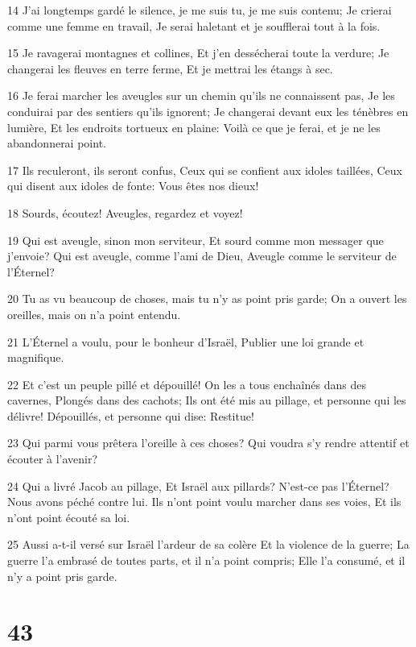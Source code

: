 \par 14 J'ai longtemps gardé le silence, je me suis tu, je me suis contenu; Je crierai comme une femme en travail, Je serai haletant et je soufflerai tout à la fois.
\par 15 Je ravagerai montagnes et collines, Et j'en dessécherai toute la verdure; Je changerai les fleuves en terre ferme, Et je mettrai les étangs à sec.
\par 16 Je ferai marcher les aveugles sur un chemin qu'ils ne connaissent pas, Je les conduirai par des sentiers qu'ils ignorent; Je changerai devant eux les ténèbres en lumière, Et les endroits tortueux en plaine: Voilà ce que je ferai, et je ne les abandonnerai point.
\par 17 Ils reculeront, ils seront confus, Ceux qui se confient aux idoles taillées, Ceux qui disent aux idoles de fonte: Vous êtes nos dieux!
\par 18 Sourds, écoutez! Aveugles, regardez et voyez!
\par 19 Qui est aveugle, sinon mon serviteur, Et sourd comme mon messager que j'envoie? Qui est aveugle, comme l'ami de Dieu, Aveugle comme le serviteur de l'Éternel?
\par 20 Tu as vu beaucoup de choses, mais tu n'y as point pris garde; On a ouvert les oreilles, mais on n'a point entendu.
\par 21 L'Éternel a voulu, pour le bonheur d'Israël, Publier une loi grande et magnifique.
\par 22 Et c'est un peuple pillé et dépouillé! On les a tous enchaînés dans des cavernes, Plongés dans des cachots; Ils ont été mis au pillage, et personne qui les délivre! Dépouillés, et personne qui dise: Restitue!
\par 23 Qui parmi vous prêtera l'oreille à ces choses? Qui voudra s'y rendre attentif et écouter à l'avenir?
\par 24 Qui a livré Jacob au pillage, Et Israël aux pillards? N'est-ce pas l'Éternel? Nous avons péché contre lui. Ils n'ont point voulu marcher dans ses voies, Et ils n'ont point écouté sa loi.
\par 25 Aussi a-t-il versé sur Israël l'ardeur de sa colère Et la violence de la guerre; La guerre l'a embrasé de toutes parts, et il n'a point compris; Elle l'a consumé, et il n'y a point pris garde.

\chapter{43}

